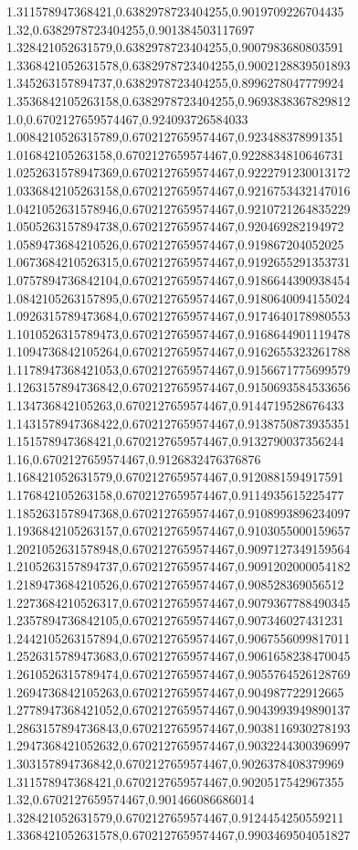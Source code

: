 1.311578947368421,0.6382978723404255,0.9019709226704435
1.32,0.6382978723404255,0.901384503117697
1.328421052631579,0.6382978723404255,0.9007983680803591
1.3368421052631578,0.6382978723404255,0.9002128839501893
1.345263157894737,0.6382978723404255,0.8996278047779924
1.3536842105263158,0.6382978723404255,0.9693838367829812
1.0,0.6702127659574467,0.924093726584033
1.0084210526315789,0.6702127659574467,0.923488378991351
1.016842105263158,0.6702127659574467,0.9228834810646731
1.0252631578947369,0.6702127659574467,0.9222791230013172
1.0336842105263158,0.6702127659574467,0.9216753432147016
1.0421052631578946,0.6702127659574467,0.9210721264835229
1.0505263157894738,0.6702127659574467,0.920469282194972
1.0589473684210526,0.6702127659574467,0.919867204052025
1.0673684210526315,0.6702127659574467,0.9192655291353731
1.0757894736842104,0.6702127659574467,0.9186644390938454
1.0842105263157895,0.6702127659574467,0.9180640094155024
1.0926315789473684,0.6702127659574467,0.9174640178980553
1.1010526315789473,0.6702127659574467,0.9168644901119478
1.1094736842105264,0.6702127659574467,0.9162655323261788
1.1178947368421053,0.6702127659574467,0.9156671775699579
1.1263157894736842,0.6702127659574467,0.9150693584533656
1.134736842105263,0.6702127659574467,0.9144719528676433
1.1431578947368422,0.6702127659574467,0.9138750873935351
1.151578947368421,0.6702127659574467,0.9132790037356244
1.16,0.6702127659574467,0.9126832476376876
1.168421052631579,0.6702127659574467,0.9120881594917591
1.176842105263158,0.6702127659574467,0.9114935615225477
1.1852631578947368,0.6702127659574467,0.9108993896234097
1.1936842105263157,0.6702127659574467,0.9103055000159657
1.2021052631578948,0.6702127659574467,0.9097127349159564
1.2105263157894737,0.6702127659574467,0.9091202000054182
1.2189473684210526,0.6702127659574467,0.908528369056512
1.2273684210526317,0.6702127659574467,0.9079367788490345
1.2357894736842105,0.6702127659574467,0.907346027431231
1.2442105263157894,0.6702127659574467,0.9067556099817011
1.2526315789473683,0.6702127659574467,0.9061658238470045
1.2610526315789474,0.6702127659574467,0.9055764526128769
1.2694736842105263,0.6702127659574467,0.904987722912665
1.2778947368421052,0.6702127659574467,0.9043993949890137
1.2863157894736843,0.6702127659574467,0.9038116930278193
1.2947368421052632,0.6702127659574467,0.9032244300396997
1.303157894736842,0.6702127659574467,0.9026378408379969
1.311578947368421,0.6702127659574467,0.9020517542967355
1.32,0.6702127659574467,0.901466086686014
1.328421052631579,0.6702127659574467,0.9124454250559211
1.3368421052631578,0.6702127659574467,0.9903469504051827
